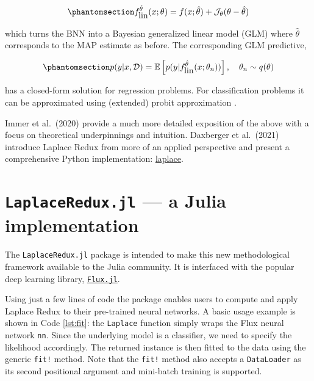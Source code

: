 \documentclass{juliacon}
\begin{document}
\begin{equation}\phantomsection\label{eq-glm}{
f^{\hat{\theta}}_{\mbox{lin}}(x;\theta)=f(x;\hat{\theta}) + \mathcal{J}_{\theta}(\theta-\hat{\theta})
}\end{equation}

which turns the BNN into a Bayesian generalized linear model (GLM) where
\(\hat{\theta}\) corresponds to the MAP estimate as before. The
corresponding GLM predictive,

\begin{equation}\phantomsection\label{eq-glm-predictive}{
p(y|x,\mathcal{D}) = \mathbb{E} \left[ p(y|f^{\hat{\theta}}_{\mbox{lin}}(x;\theta_n)) \right], \ \ \ \theta_n \sim q(\theta)
}\end{equation}

has a closed-form solution for regression problems. For classification
problems it can be approximated using (extended) probit approximation
\cite{daxberger2021laplace}.

Immer et al.~(2020) \cite{immer2020improving} provide a much more
detailed exposition of the above with a focus on theoretical
underpinnings and intuition. Daxberger et al.~(2021)
\cite{daxberger2021laplace} introduce Laplace Redux from more of an
applied perspective and present a comprehensive Python implementation:
\href{https://aleximmer.github.io/Laplace/}{laplace}.

\section{\texorpdfstring{\texttt{LaplaceRedux.jl} --- a Julia
implementation}{LaplaceRedux.jl --- a Julia implementation}}\label{laplaceredux.jl-a-julia-implementation}

The \texttt{LaplaceRedux.jl} package is intended to make this new
methodological framework available to the Julia community. It is
interfaced with the popular deep learning library,
\href{https://fluxml.ai/}{\texttt{Flux.jl}}.

Using just a few lines of code the package enables users to compute and
apply Laplace Redux to their pre-trained neural networks. A basic usage
example is shown in Code \ref{lst:fit}: the \texttt{Laplace} function
simply wraps the Flux neural network \texttt{nn}. Since the underlying
model is a classifier, we need to specify the likelihood accordingly.
The returned instance is then fitted to the data using the generic
\texttt{fit!} method. Note that the \texttt{fit!} method also accepts a
\texttt{DataLoader} as its second positional argument and mini-batch
training is supported.
\end{document}
